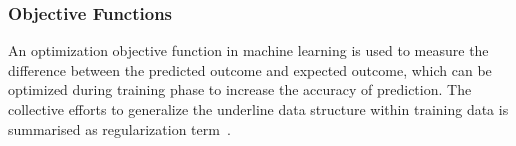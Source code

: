 \subsubsection{Objective Functions}
An optimization objective function in machine learning is used to measure the difference between the predicted outcome and expected outcome, which can be optimized during training phase to increase the accuracy of prediction. The collective efforts to generalize the underline data structure within training data is summarised as regularization term~\cite{goodfellow_2015}.  